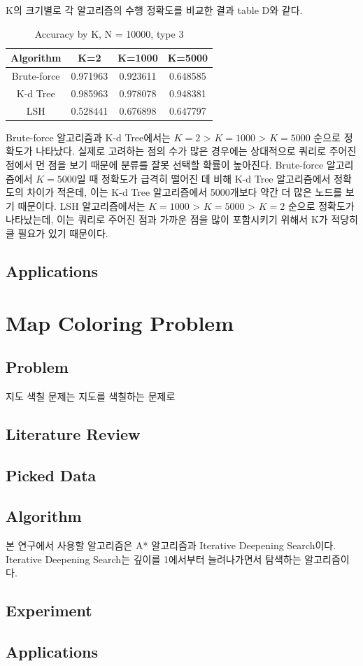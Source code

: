 \documentclass{sig-alternate-05-2015}
\begin{document}
\begin{CJK}{UTF8}{mj}
K의 크기별로 각 알고리즘의 수행 정확도를 비교한 결과 table D와 같다.

\begin{table}
\centering
\caption{Accuracy by K, N = 10000, type 3}
\begin{tabular}{|c|c|c|c|} \hline
Algorithm & K=2 & K=1000 & K=5000 \\ \hline
Brute-force & 0.971963 & 0.923611 & 0.648585 \\ \hline
K-d Tree & 0.985963 & 0.978078 & 0.948381 \\ \hline
LSH & 0.528441 & 0.676898 & 0.647797 \\ 
\hline\end{tabular}
\end{table}

Brute-force 알고리즘과 K-d Tree에서는 $K=2$ > $K=1000$ > $K=5000$ 순으로 정확도가 나타났다. 실제로 고려하는 점의 수가 많은 경우에는 상대적으로 쿼리로 주어진 점에서 먼 점을 보기 때문에 분류를 잘못 선택할 확률이 높아진다. Brute-force 알고리즘에서 $K=5000$일 때 정확도가 급격히 떨어진 데 비해 K-d Tree 알고리즘에서 정확도의 차이가 적은데, 이는 K-d Tree 알고리즘에서 5000개보다 약간 더 많은 노드를 보기 때문이다. LSH 알고리즘에서는 $K=1000$ > $K=5000$ > $K=2$ 순으로 정확도가 나타났는데, 이는 쿼리로 주어진 점과 가까운 점을 많이 포함시키기 위해서 K가 적당히 클 필요가 있기 때문이다.

\subsection{Applications}
\end{CJK}

\section{Map Coloring Problem}
\begin{CJK}{UTF8}{mj}
\subsection{Problem}
지도 색칠 문제는 지도를 색칠하는 문제로 
\subsection{Literature Review}
\subsection{Picked Data}
\subsection{Algorithm}
본 연구에서 사용할 알고리즘은 A* 알고리즘과 Iterative Deepening Search이다.
Iterative Deepening Search는 깊이를 1에서부터 늘려나가면서 탐색하는 알고리즘이다.
\subsection{Experiment}
\subsection{Applications}
\end{CJK}
\end{document}
